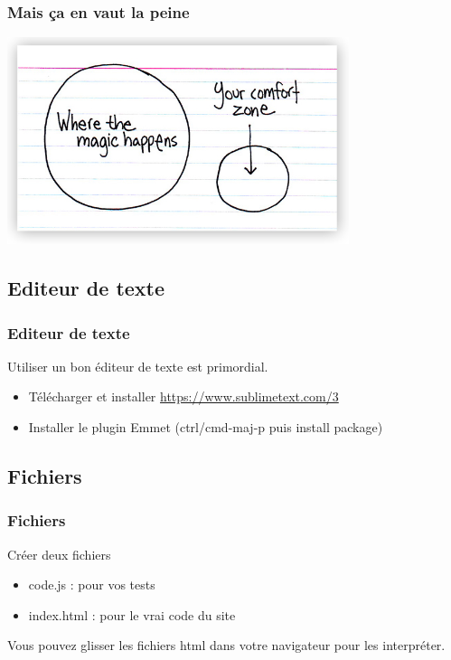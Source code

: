 \documentclass{beamer}
\begin{document}
    \begin{frame}
		\frametitle{Mais ça en vaut la peine}
		\centering \includegraphics[width=10cm]{images/wherethemagichappens.jpg} 
    \end{frame}

    \subsection{Editeur de texte}
    \begin{frame}
		\frametitle{Editeur de texte}

    	Utiliser un bon éditeur de texte est primordial.
        \begin{itemize}
			\item{Télécharger et installer \url{https://www.sublimetext.com/3}}
			\item{Installer le plugin Emmet (ctrl/cmd-maj-p puis install package)}	
        \end{itemize}
		
    \end{frame}

    \subsection{Fichiers}
    \begin{frame}
		\frametitle{Fichiers}

        Créer deux fichiers
        \begin{itemize}
          \item code.js : pour vos tests
          \item index.html : pour le vrai code du site
        \end{itemize}
        
        \vspace{1cm}
        \centering Vous pouvez glisser les fichiers html dans votre navigateur pour les interpréter.
    \end{frame}
\end{document}
